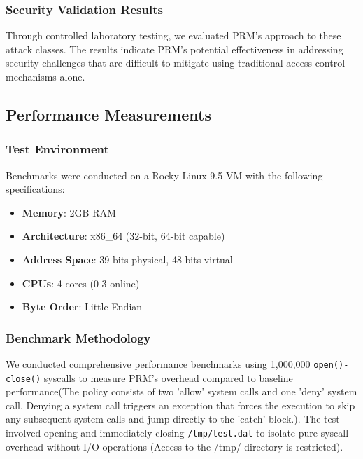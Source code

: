 \documentclass[conference]{IEEEtran}
\begin{document}
\subsubsection{Security Validation Results}
Through controlled laboratory testing, we evaluated PRM's approach to these attack classes. The results indicate PRM's potential effectiveness in addressing security challenges that are difficult to mitigate using traditional access control mechanisms alone.

\subsection{Performance Measurements}
\label{sec:performance_measurements}

\subsubsection{Test Environment}
Benchmarks were conducted on a Rocky Linux 9.5 VM with the following specifications:
\begin{itemize}
\item \textbf{Memory}: 2GB RAM
\item \textbf{Architecture}: x86\_64 (32-bit, 64-bit capable)
\item \textbf{Address Space}: 39 bits physical, 48 bits virtual
\item \textbf{CPUs}: 4 cores (0-3 online)
\item \textbf{Byte Order}: Little Endian
\end{itemize}

\subsubsection{Benchmark Methodology}
We conducted comprehensive performance benchmarks using 1,000,000 \texttt{open()-close()} syscalls to measure PRM's overhead compared to baseline performance(The policy consists of two 'allow' system calls and one 'deny' system call. Denying a system call triggers an exception that forces the execution to skip any subsequent system calls and jump directly to the 'catch' block.). The test involved opening and immediately closing \texttt{/tmp/test.dat} to isolate pure syscall overhead without I/O operations (Access to the /tmp/ directory is restricted).
\end{document}
